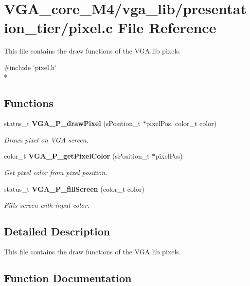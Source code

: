 \section{V\+G\+A\+\_\+core\+\_\+\+M4/vga\+\_\+lib/presentation\+\_\+tier/pixel.c File Reference}
\label{pixel_8c}


This file contains the draw functions of the V\+GA lib pixels.  


{\ttfamily \#include \char`\"{}pixel.\+h\char`\"{}}\\*
\subsection*{Functions}
\begin{DoxyCompactItemize}
\item 
status\+\_\+t {\bf V\+G\+A\+\_\+\+P\+\_\+draw\+Pixel} (s\+Position\+\_\+t $\ast$pixel\+Pos, color\+\_\+t color)
\begin{DoxyCompactList}\small\item\em Draws pixel on V\+GA screen. \end{DoxyCompactList}\item 
color\+\_\+t {\bf V\+G\+A\+\_\+\+P\+\_\+get\+Pixel\+Color} (s\+Position\+\_\+t $\ast$pixel\+Pos)
\begin{DoxyCompactList}\small\item\em Get pixel color from pixel position. \end{DoxyCompactList}\item 
status\+\_\+t {\bf V\+G\+A\+\_\+\+P\+\_\+fill\+Screen} (color\+\_\+t color)
\begin{DoxyCompactList}\small\item\em Fills screen with input color. \end{DoxyCompactList}\end{DoxyCompactItemize}


\subsection{Detailed Description}
This file contains the draw functions of the V\+GA lib pixels. 



\subsection{Function Documentation}
